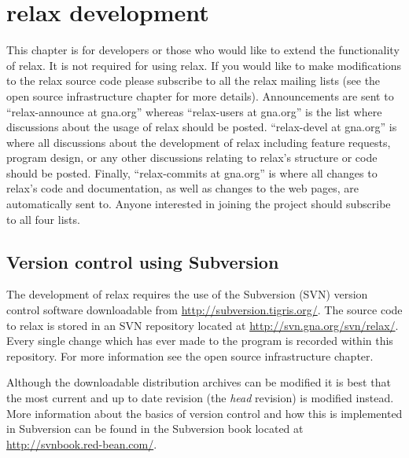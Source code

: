 
\chapter{relax development}

This chapter is for developers or those who would like to extend the functionality of relax.  It is not required for using relax.  If you would like to make modifications to the relax source code please subscribe to all the relax mailing lists (see the open source infrastructure chapter for more details).  Announcements are sent to ``relax-announce at gna.org'' whereas ``relax-users at gna.org'' is the list where discussions about the usage of relax should be posted.  ``relax-devel at gna.org'' is where all discussions about the development of relax including feature requests, program design, or any other discussions relating to relax's structure or code should be posted.  Finally, ``relax-commits at gna.org'' is where all changes to relax's code and documentation, as well as changes to the web pages, are automatically sent to.  Anyone interested in joining the project should subscribe to all four lists.




\section{Version control using Subversion}\label{svn repository}

The development of relax requires the use of the Subversion (SVN) version control software downloadable from \href{http://subversion.tigris.org/}{http://subversion.tigris.org/}.  The source code to relax is stored in an SVN repository located at \href{http://svn.gna.org/svn/relax/}{http://svn.gna.org/svn/relax/}.  Every single change which has ever made to the program is recorded within this repository.  For more information see the open source infrastructure chapter.

Although the downloadable distribution archives can be modified it is best that the most current and up to date revision (the \textit{head} revision) is modified instead.  More information about the basics of version control and how this is implemented in Subversion can be found in the Subversion book located at \href{http://svnbook.red-bean.com/}{http://svnbook.red-bean.com/}.

